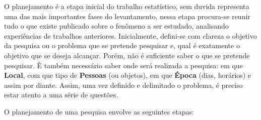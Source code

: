 O planejamento é a etapa inicial do trabalho estatístico, sem duvida representa uma das mais importantes fases do levantamento, nessa etapa procura-se reunir tudo o que existe publicado sobre o fe\-nô\-me\-no a ser estudado, analisando experiências de trabalhos anteriores. Inicialmente, defini-se com clareza o objetivo da pesquisa ou o problema que se pretende pesquisar e, qual é exatamente o objetivo que se deseja alcançar. Porém, não é suficiente saber o que se pretende pesquisar. È também necessário saber onde será realizada a pesquisa: em que \textbf{Local}, com que tipo de \textbf{Pessoas} (ou objetos), em que \textbf{Época} (dias, horários) e assim por diante. Assim, uma vez definido e delimitado o problema, é preciso estar atento a uma série de questões.\vskip0.3cm


O planejamento de uma pesquisa envolve as seguintes etapas:


